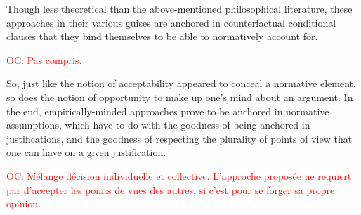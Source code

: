 \documentclass[preprint,11pt]{elsarticle}
\newcommand{\commentOC}[1]{\textcolor{red}{OC: #1}}
\begin{document}
 Though less theoretical than the above-mentioned philosophical literature, these approaches in their various guises are anchored in counterfactual conditional clauses that they bind themselves to be able to normatively account for. 
 
 \commentOC{ Pas compris.}
 
 So, just like the notion of acceptability appeared to conceal a normative element, so does the notion of opportunity to make up one’s mind about an argument. In the end, empirically-minded approaches prove to be anchored in normative assumptions, which have to do with the goodness of being anchored in justifications, and the goodness of respecting the plurality of points of view that one can have on a given justification.
 
 \commentOC{Mélange décision individuelle et
collective. L’approche proposée ne requiert par d’accepter
les points de vues des autres, si c’est pour se forger sa
propre opinion.}
 
\end{document}
